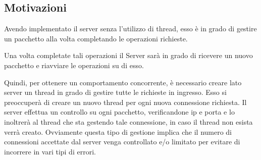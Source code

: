 \documentclass[a4paper]{article}
\begin{document}
\subsection{Motivazioni}
\par Avendo implementato il server senza l’utilizzo di thread, esso è in grado di gestire un pacchetto alla volta completando le operazioni richieste.
\par Una volta completate tali operazioni il Server sarà in grado di ricevere un nuovo pacchetto e riavviare le operazioni su di esso. 
\par Quindi, per ottenere un comportamento concorrente, è necessario creare lato server un thread in grado di gestire tutte le richieste in ingresso. Esso si preoccuperà di creare un nuovo thread per ogni nuova connessione richiesta. Il server effettua un controllo su ogni pacchetto, verificandone  ip e porta e lo inoltrerà al thread che sta gestendo tale connessione, in caso il thread non esista verrà creato. Ovviamente questa tipo di gestione implica che il numero di connessioni accettate dal server venga controllato e/o limitato per evitare di incorrere in vari tipi di errori. 
\end{document}
